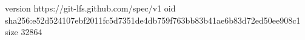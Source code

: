version https://git-lfs.github.com/spec/v1
oid sha256:e52d524107ebf2011fc5d7351de4db759f763bb83b41ae6b83d72ed50ee908c1
size 32864
